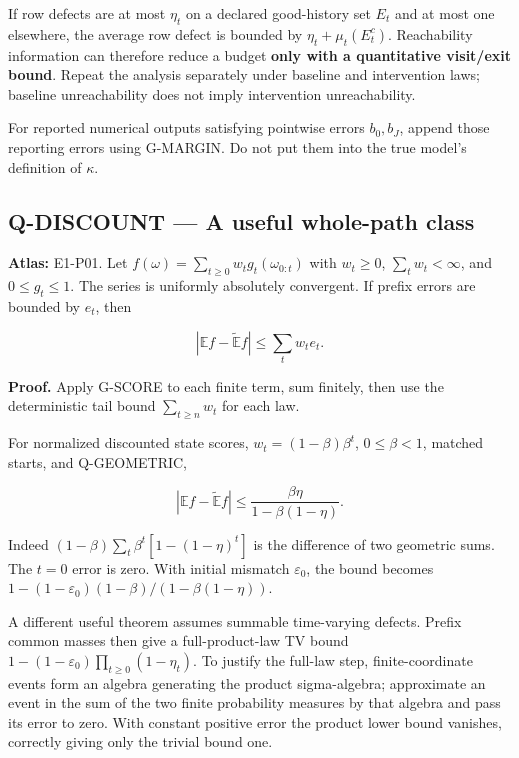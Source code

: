 \documentclass[
  11pt,
  a4paper,
]{article}
\begin{document}
If row defects are at most \(\eta_t\) on a declared good-history set
\(E_t\) and at most one elsewhere, the average row defect is bounded by
\(\eta_t+\mu_t(E_t^c)\). Reachability information can therefore reduce a
budget \textbf{only with a quantitative visit/exit bound}. Repeat the
analysis separately under baseline and intervention laws; baseline
unreachability does not imply intervention unreachability.

For reported numerical outputs satisfying pointwise errors \(b_0,b_J\),
append those reporting errors using G-MARGIN. Do not put them into the
true model's definition of \(\kappa\).

\subsection{Q-DISCOUNT --- A useful whole-path
class}\label{q-discount-a-useful-whole-path-class}

\textbf{Atlas:} E1-P01. Let
\(f(\omega)=\sum_{t\ge0}w_t g_t(\omega_{0:t})\) with \(w_t\ge0\),
\(\sum_t w_t<\infty\), and \(0\le g_t\le1\). The series is uniformly
absolutely convergent. If prefix errors are bounded by \(e_t\), then

\[|\mathbb E f-\widetilde{\mathbb E} f|\le\sum_t w_t e_t.\]

\textbf{Proof.} Apply G-SCORE to each finite term, sum finitely, then
use the deterministic tail bound \(\sum_{t\ge n}w_t\) for each law.

For normalized discounted state scores, \(w_t=(1-\beta)\beta^t\),
\(0\le\beta<1\), matched starts, and Q-GEOMETRIC,

\[\boxed{
|\mathbb E f-\widetilde{\mathbb E} f|
\le\frac{\beta\eta}{1-\beta(1-\eta)}.}
\]

Indeed \((1-\beta)\sum_t\beta^t[1-(1-\eta)^t]\) is the difference of two
geometric sums. The \(t=0\) error is zero. With initial mismatch
\(\varepsilon_0\), the bound becomes
\(1-(1-\varepsilon_0)(1-\beta)/(1-\beta(1-\eta))\).

A different useful theorem assumes summable time-varying defects. Prefix
common masses then give a full-product-law TV bound
\(1-(1-\varepsilon_0)\prod_{t\ge0}(1-\eta_t)\). To justify the full-law
step, finite-coordinate events form an algebra generating the product
sigma-algebra; approximate an event in the sum of the two finite
probability measures by that algebra and pass its error to zero. With
constant positive error the product lower bound vanishes, correctly
giving only the trivial bound one.
\end{document}
